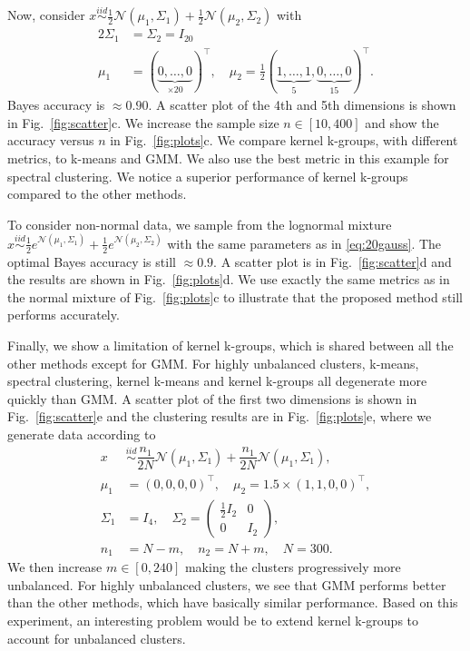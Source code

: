 \documentclass[10pt,journal,compsoc]{IEEEtran}
\begin{document}
Now, consider
$x \stackrel{iid}{\sim} \tfrac{1}{2} \mathcal{N}(\mu_1,\Sigma_1)+
\tfrac{1}{2} \mathcal{N}(\mu_2,\Sigma_2)$
with 
\begin{equation}
\label{eq:20gauss}
\begin{split}
2\Sigma_1 &= \Sigma_2 = I_{20} \\
\mu_1 &= (\underbrace{0,\dotsc,0}_{\times 20})^\top , 
\quad \mu_2 = \tfrac{1}{2} 
(\underbrace{1,\dotsc,1}_{5},\underbrace{0,\dotsc,0}_{15})^\top.
\end{split}
\end{equation}
Bayes accuracy is $\approx 0.90$.  A scatter plot of the 4th and 5th
dimensions is shown in Fig.~\ref{fig:scatter}c.
We increase the sample size $n \in [10, 400]$ and show
the accuracy versus $n$ in Fig.~\ref{fig:plots}c. We compare
kernel k-groups, with different metrics,
to k-means and GMM. We also use
the best metric in this example for spectral clustering.
We notice a superior performance of kernel k-groups 
compared to the other methods.

To consider non-normal data, we sample from the lognormal mixture 
$x \stackrel{iid}{\sim} \tfrac{1}{2} 
e^{\mathcal{N}(\mu_1,\Sigma_1)}+
\tfrac{1}{2} e^{\mathcal{N}(\mu_2,\Sigma_2)}$ with the same
parameters as in \eqref{eq:20gauss}. 
The optimal Bayes accuracy is still $\approx 0.9$.
A scatter plot is in Fig.~\ref{fig:scatter}d and the
results are shown in Fig.~\ref{fig:plots}d.
We use exactly the same metrics as in the normal
mixture of Fig.~\ref{fig:plots}c to illustrate that the 
proposed method still performs accurately.

Finally, we show a limitation of kernel k-groups, which is shared
between 
all the other methods except for GMM.
For highly unbalanced clusters, k-means, spectral
clustering, kernel k-means and kernel k-groups all degenerate
more quickly than GMM. A scatter plot of the first two dimensions
is shown in Fig.~\ref{fig:scatter}e and the clustering results are
in Fig.~\ref{fig:plots}e,
where we generate data according to
\begin{equation}
\label{eq:gauss3}
\begin{split}
x &\stackrel{iid} \sim  
\dfrac{n_1}{2N} \mathcal{N}(\mu_1,\Sigma_1)+
\dfrac{n_1}{2N} \mathcal{N}(\mu_1,\Sigma_1), \\
\mu_1 &= (0,0,0,0)^\top , \quad
\mu_2 = 1.5\times (1,1,0,0)^\top, \\
\Sigma_1 &= I_4, \quad
\Sigma_2 = \left( 
\begin{array}{c|c} 
\tfrac{1}{2} I_2 & 0  \\ \hline
0 & I_2 
\end{array}\right), \\
n_1 &= N - m, \quad  n_2 = N + m, \quad N=300.
\end{split}
\end{equation}
We then increase $m \in [0,240]$ making
the clusters progressively more unbalanced.
For highly unbalanced clusters, we see that GMM performs better than
the other methods, which have basically similar performance.
Based on this experiment, an interesting problem would be to
extend kernel k-groups to account for unbalanced clusters.
\end{document}
